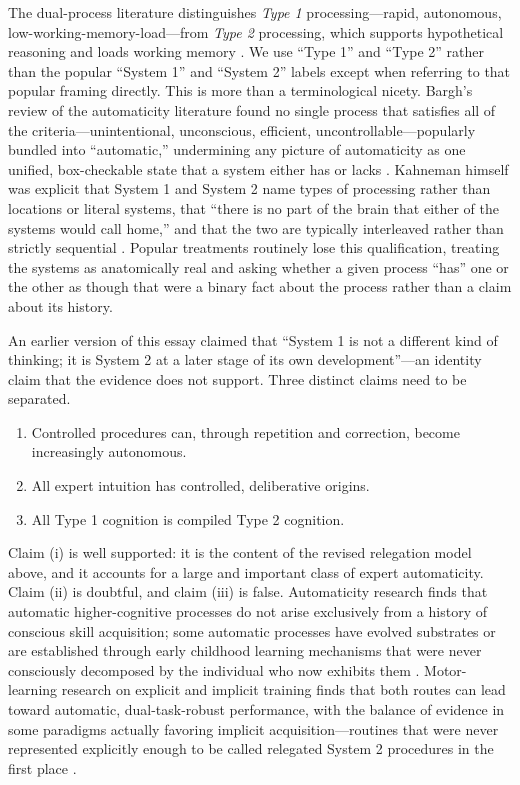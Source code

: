 \documentclass[12pt, a4paper]{article}
\theoremstyle{plain}
\theoremstyle{definition}
\theoremstyle{remark}
\begin{document}
The dual-process literature distinguishes \emph{Type 1} processing---rapid, autonomous, low-working-memory-load---from \emph{Type 2} processing, which supports hypothetical reasoning and loads working memory \cite{evans2013}. We use ``Type 1'' and ``Type 2'' rather than the popular ``System 1'' and ``System 2'' labels except when referring to that popular framing directly. This is more than a terminological nicety. Bargh's review of the automaticity literature found no single process that satisfies all of the criteria---unintentional, unconscious, efficient, uncontrollable---popularly bundled into ``automatic,'' undermining any picture of automaticity as one unified, box-checkable state that a system either has or lacks \cite{bargh1992}. Kahneman himself was explicit that System 1 and System 2 name types of processing rather than locations or literal systems, that ``there is no part of the brain that either of the systems would call home,'' and that the two are typically interleaved rather than strictly sequential \cite{kahneman2011}. Popular treatments routinely lose this qualification, treating the systems as anatomically real and asking whether a given process ``has'' one or the other as though that were a binary fact about the process rather than a claim about its history.

An earlier version of this essay claimed that ``System 1 is not a different kind of thinking; it is System 2 at a later stage of its own development''---an identity claim that the evidence does not support. Three distinct claims need to be separated.

\begin{enumerate}
\item[(i)] Controlled procedures can, through repetition and correction, become increasingly autonomous.
\item[(ii)] All expert intuition has controlled, deliberative origins.
\item[(iii)] All Type 1 cognition is compiled Type 2 cognition.
\end{enumerate}

Claim (i) is well supported: it is the content of the revised relegation model above, and it accounts for a large and important class of expert automaticity. Claim (ii) is doubtful, and claim (iii) is false. Automaticity research finds that automatic higher-cognitive processes do not arise exclusively from a history of conscious skill acquisition; some automatic processes have evolved substrates or are established through early childhood learning mechanisms that were never consciously decomposed by the individual who now exhibits them \cite{bargh2012}. Motor-learning research on explicit and implicit training finds that both routes can lead toward automatic, dual-task-robust performance, with the balance of evidence in some paradigms actually favoring implicit acquisition---routines that were never represented explicitly enough to be called relegated System 2 procedures in the first place \cite{kal2018}.
\end{document}
